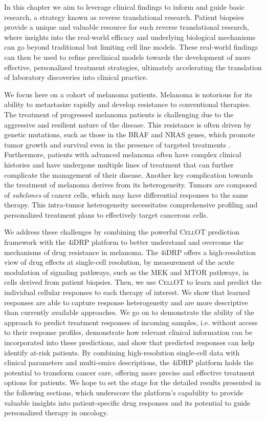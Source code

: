 In this chapter
we aim to leverage clinical findings to inform and guide basic research, a strategy known as reverse translational research.
Patient biopsies provide a unique and valuable resource for such reverse translational research,
where insights into the real-world efficacy and underlying biological mechanisms can go beyond traditional but limiting cell line models.
These real-world findings can then be used to refine preclinical models towards the development of more effective, personalized treatment strategies, ultimately accelerating the translation of laboratory discoveries into clinical practice.

We focus here on a cohort of melanoma patients.
Melanoma is notorious for its ability to metastasize rapidly and develop resistance to conventional therapies.
The treatment of progressed melanoma patients is challenging due to the aggressive and resilient nature of the disease.
This resistance is often driven by genetic mutations, such as those in the BRAF and NRAS genes, which promote tumor growth and survival even in the presence of targeted treatments \cite{arozarena2019}.
Furthermore, patients with advanced melanoma often have complex clinical histories and have undergone multiple lines of treatment that can further complicate the management of their disease.
Another key complication towards the treatment of melanoma derives from its heterogeneity.
Tumors are composed of \emph{subclones} of cancer cells, which may have differential responses to the same therapy.
This intra-tumor heterogeneity necessitates comprehensive profiling and personalized treatment plans to effectively target cancerous cells.

We address these challenges by combining
the powerful \textsc{CellOT} prediction framework with the 4iDRP platform
to better understand and overcome the mechanisms of drug resistance in melanoma.
The 4iDRP offers a high-resolution view of drug effects at single-cell resolution, by measurement of the acute modulation of signaling pathways, such as the MEK and MTOR pathways, in cells derived from patient biopsies.
Then, we use \textsc{CellOT} to learn and predict the individual cellular responses to each therapy of interest.
We show that learned responses are able to capture response heterogeneity and are more descriptive than currently available approaches.
We go on to demonstrate the ability of the approach to predict treatment responses of incoming samples, i.e. without access to their response profiles,
demonstrate how relevant clinical information can be incorporated into these predictions,
and show that predicted responses can help identify at-risk patients.
By combining high-resolution single-cell data with clinical parameters and multi-omics descriptions, the 4iDRP platform holds the potential to transform cancer care, offering more precise and effective treatment options for patients.
We hope to set the stage for the detailed results presented in the following sections, which underscore the platform's capability to provide valuable insights into patient-specific drug responses and its potential to guide personalized therapy in oncology.
